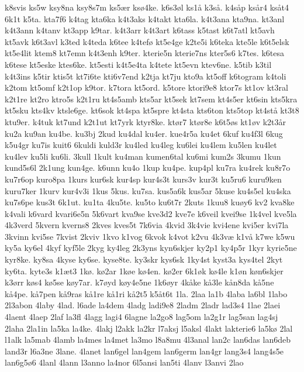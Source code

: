 k8svis
ks5w
ksy8na
ksy8s7m
ks5^^e6r
ks^^f84ke.
k6s3^^f8l
ks1^^e5
k3s^^e5.
k4s^^e5p
ks^^e5r4
ks^^e5t4
6k1t
k5ta.
kta7f6
k4tag
kta6ka
k4t3aks
k4takt
kta6la.
k4t3ana
kta9na.
kt3anl
k4t3ann
k4tanv
kt3app
k9tar.
k4t3arr
k4t3art
k6tass
k5tast
k6t7atl
kt5avh
kt5avk
k6t3avl
k3ted
k4teda
k6tee
k4tef^^f8
kt5e4ge
k2te5i
k6teka
kte5le
k6t5elsk
kt5e4lit
ktem8
kt7emn
k4t3enh
k9ter.
kterie5n
kterie7ns
kter5s6
k7tes.
k6tesa
k6tese
kt5eske
ktes6ke.
kt5esti
k4t5e4ta
k4tete
kt5evn
ktev6ne.
k5tib
k3til
k4t3ins
k5tir
ktis5t
kt7i6te
kti6v7end
k2tja
kt7ju
kto9a
kt5off
k6togram
k4toli
k2tom
kt5omf
k2t1op
k9tor.
k7tora
kt5ord.
k5tore
ktori9e8
ktor7s
kt1ov
kt3ral
k2t1re
kt2ro
ktro5s
k2t1ru
kt4s5amb
kts5ar
kt5sek
kt7sem
kt4s5er
kt6sin
kts5kra
kt5sku
kts4kv
ktsle6ge.
kt6sok
kt4spa
kt5spre
kt4sta
kts6ton
kts5top
kt4st^^e5
kt3t8
ktu9er.
k4tuk
kt7und
k2t1ut
kt7yrk
ktyr8ke.
kt^^f8r7
kt^^f8r8e
k6t5^^f8s
kt1^^f8v
k2t3^^e5r
ku2a
ku9an
ku4be.
ku3bj
2kud
ku4dal
ku4er.
kue4r5a
ku4et
6kuf
ku4f3l
6kug
k5u4gr
ku7is
kuit6
6kuldi
kuld3r
ku4led
ku4leg
ku6lei
ku4lem
ku5len
ku4let
ku4lev
ku5li
ku6li.
3kull
1kult
ku4man
kumen6tal
ku6mi
kum2s
3kumu
1kun
kund5s6l
2k1ung
kun4ge.
k6unn
ku4o
1kup
ku4pe.
kup4pl
ku7ra
ku4rek
ku8r7o
ku7r6op
kuro8pa
1kurs
kur6sk
kur4sp
kur4s3t
kurs3v
kur3t
ku5ru6
kuru9ken
kuru7ker
1kurv
kur4v3i
1kus
5kus.
ku7sa.
kus5a6k
kus5ar
5kuse
ku4s5el
ku4ska
ku7s6pe
kus3t
6k1ut.
ku1ta
4ku5te.
ku5to
ku6t7r
2kuts
1kuu8
ku^^f8y6
kv2
kva8ke
k4vali
k6vard
kvari6e5n
5k6vart
kva9se
kve3d2
kve7e
k6veil
kvei9se
1k4vel
kve5la
4k3verd
5kvern
kverns8
2kves
kves5t
7k6via
4kvid
3k4vie
kvi4ene
kvi5er
kvi7la
3kvinn
kvi5se
7kvist
2kviv
1kvo
k1vog
6kvok
k4vot
k2vu
4k3v^^e6
k1v^^e5
k7we
k5wu
ky5a
ky6el
4kyf
kyf5le
2kyg
ky4leg
2k3yns
kyn6skjer
ky2p1
ky4p5r
1kyr
kyrie5ne
kyr8ke.
ky8sa
4kyse
ky6se.
kyse8te.
ky3skr
kys6sk
1ky4st
kyst3a
kys4tel
2kyt
ky6ta.
kyte3s
k1^^e6t3
1k^^f8.
k^^f82ar
1k^^f8e
k^^f84en.
k^^f82er
6k1^^f8k
k^^f84le
k1^^f8n
k^^f8n6skjer
k3^^f8rr
k^^f8s4
k^^f85se
k^^f8y7ar.
k7^^f8yd
k^^f8y4e5ne
1k6^^f8yr
4k^^e5ke
k^^e53le
k^^e5n8da
k^^e55ne
k^^e54pe.
k^^e57pen
k^^e59ras
k^^e51re
k^^e51ri
k^^e52t5
k5^^e5t6t
1la.
2laa
la1b
4laba
la6bl
1labo
2l3abon
4laby
4lad.
l6ade
la4dem
4ladg
ladi9e8
2ladm
2ladr
lad3s4
1lae
2laei
4laent
4laep
2laf
la3fl
4lagg
lagi4
6lagne
la2go8
lag5om
la2g1r
lag5san
lag4sj
2laha
2la1in
la5ka
la4ke.
4lakj
l2akk
la2kr
l7aksj
l5aksl
4lakt
lakterie6
la5k^^f8
2lal
l1alk
la5mab
4lamb
la4mes
la4met
la3mo
l8a8mu
4l3anal
lan2c
lan6das
lan6deb
land3r
l6a3ne
3lane.
4lanet
lan6gel
lan4gem
lan6germ
lan4gr
lang3s4
lang4s5e
lan6g5^^f86
4lanl
4lann
l3anno
la4nor
6l5ansi
lan5ti
4lanv
l3anvi
2lao
